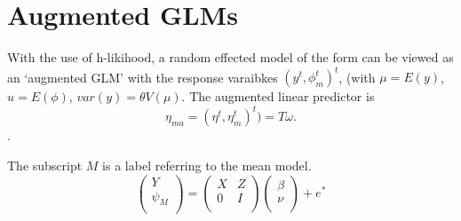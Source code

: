 \documentclass[Chap5dmain.tex]{subfiles}
\begin{document}




\section{Augmented GLMs} %

With the use of h-likihood, a random effected model of the form can be viewed as an `augmented GLM' with the response varaibkes $(y^t, \phi^t_m)^t$, (with $\mu = E(y)$,$ u = E(\phi)$, $var(y) = \theta V (\mu)$.
The augmented linear predictor is \[\eta_{ma}  = (\eta^t, \eta^t_m)^t) = T\omega. \].



The subscript $M$ is a label referring to the mean model.
\begin{equation}
\left(%
\begin{array}{c}
  Y \\
  \psi_{M} \\
\end{array}%
\right) = \left(
\begin{array}{cc}
  X & Z \\
  0 & I \\
\end{array}\right) \left(%
\begin{array}{c}
  \beta \\
  \nu \\
\end{array}%
\right)+ e^{*}
\end{equation}
\end{document}
